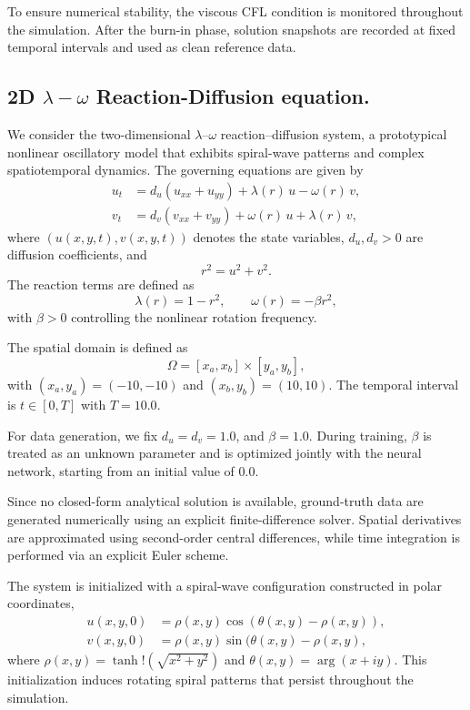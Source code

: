 \documentclass{article}
\theoremstyle{plain}
\theoremstyle{definition}
\theoremstyle{remark}
\begin{document}
To ensure numerical stability, the viscous CFL condition is monitored throughout the simulation. After the burn-in phase, solution snapshots are recorded at fixed temporal intervals and used as clean reference data.

\subsection{2D $\lambda-\omega$ Reaction-Diffusion equation.}

We consider the two-dimensional $\lambda$–$\omega$ reaction–diffusion system, a prototypical nonlinear oscillatory model that exhibits spiral-wave patterns and complex spatiotemporal dynamics. The governing equations are given by
\begin{align}
u_t &= d_u (u_{xx} + u_{yy}) + \lambda(r)\,u - \omega(r)\,v, \\
v_t &= d_v (v_{xx} + v_{yy}) + \omega(r)\,u + \lambda(r)\,v,
\end{align}
where $(u(x,y,t), v(x,y,t))$ denotes the state variables, $d_u, d_v > 0$ are diffusion coefficients, and
\begin{equation}
r^2 = u^2 + v^2.
\end{equation}
The reaction terms are defined as
\begin{equation}
\lambda(r) = 1 - r^2, 
\qquad 
\omega(r) = -\beta r^2,
\end{equation}
with $\beta > 0$ controlling the nonlinear rotation frequency.

The spatial domain is defined as
\begin{equation}
\Omega = [x_a, x_b] \times [y_a, y_b],
\end{equation}
with $(x_a, y_a) = (-10, -10)$ and $(x_b, y_b) = (10, 10)$.
The temporal interval is $t \in [0, T]$ with $T = 10.0$.

For data generation, we fix $d_u = d_v = 1.0$, and $\beta = 1.0$. During training, $\beta$ is treated as an unknown parameter and is optimized jointly with the neural network, starting from an initial value of $0.0$.

Since no closed-form analytical solution is available, ground-truth data are generated numerically using an explicit finite-difference solver. Spatial derivatives are approximated using second-order central differences, while time integration is performed via an explicit Euler scheme.

The system is initialized with a spiral-wave configuration constructed in polar coordinates,
\begin{align}
    u(x,y,0) &= \rho(x,y) \cos(\theta(x,y) - \rho(x,y)), \\
    v(x,y,0) &= \rho(x,y) \sin(\theta(x,y) - \rho(x,y),
\end{align}
where $\rho(x,y) = \tanh!\left(\sqrt{x^2 + y^2}\right)$ and $\theta(x,y) = \arg(x + i y)$. This initialization induces rotating spiral patterns that persist throughout the simulation.
\end{document}

